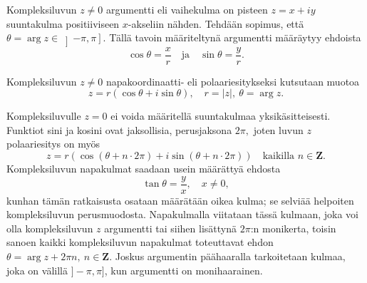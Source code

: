 \documentclass[a4paper, 12pt]{article}
\theoremstyle{remark}
\theoremstyle{definition}
\renewcommand{\bar}[1]{\overline{#1}}
\newcommand{\abs}[1]{\lvert#1\rvert}
\begin{document}
\begin{maar} Kompleksiluvun $z\neq 0$ argumentti eli vaihekulma on pisteen $z=x+iy$ suuntakulma positiiviseen $x$-akseliin nähden. Tehdään sopimus, että
$\theta =\arg z\in\left]-\pi, \pi\right].$ Tällä tavoin määriteltynä argumentti määräytyy ehdoista
$$
\cos \theta=\frac{x}{r}\quad\text{ja}\quad \sin \theta=\frac{y}{r}.
$$
\end{maar}
\begin{maar}
Kompleksiluvun $z\neq 0$ napakoordinaatti- eli polaariesitykseksi kutsutaan muotoa
$$
z=r(\cos \theta +i\sin\theta),\quad r=\abs{z}, \ \theta =\arg z.
$$
\end{maar}
\begin{huom}
Kompleksiluvulle $z=0$ ei voida määritellä suuntakulmaa yksikäsitteisesti. Funktiot sini ja kosini ovat jaksollisia, perusjaksona $2\pi,$ joten luvun $z$ polaariesitys on myös
$$
z=r\left(\cos(\theta+n\cdot 2\pi)+i\sin(\theta+n\cdot 2\pi)\right)\quad\text{kaikilla } n\in\mathbf{Z}.
$$
Kompleksiluvun napakulmat saadaan usein määrättyä ehdosta
$$
\tan \theta=\frac{y}{x},\quad x\neq 0,
$$
kunhan tämän ratkaisusta osataan määrätään oikea kulma; se selviää helpoiten kompleksiluvun perusmuodosta. Napakulmalla viitataan tässä kulmaan, joka voi olla kompleksiluvun $z$ argumentti tai siihen lisättynä $2\pi$:n monikerta, toisin sanoen kaikki kompleksiluvun napakulmat toteuttavat ehdon $\theta=\arg z +2\pi n,\ n\in\mathbf{Z}.$ Joskus argumentin päähaaralla tarkoitetaan kulmaa, joka on välillä $]-\pi, \pi]$, kun argumentti on monihaarainen.
\end{huom}

\end{document}
